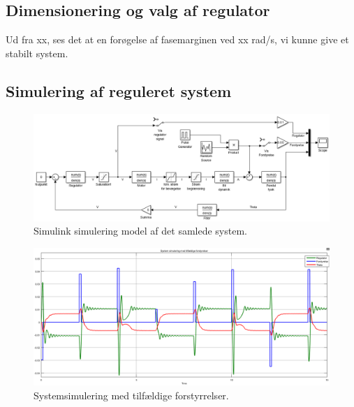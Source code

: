 \subsection{Dimensionering og valg af regulator}
Ud fra xx, ses det at en forøgelse af fasemarginen ved xx rad/s, vi kunne give et stabilt system.


\subsection{Simulering af reguleret system}
\begin{figure}[h!]
	\centering
	\includegraphics[width=1\textwidth]{billeder/transfunc_sim.png}
	\caption{Simulink simulering model af det samlede system.}
	\label{fig:transfunc_sim}
\end{figure}
\FloatBlock 


\begin{figure}[h!]
	\centering
	\includegraphics[width=1\textwidth]{billeder/system_sim_stimuli.png}
	\caption{Systemsimulering med tilfældige forstyrrelser.}
	\label{fig:system_sim_stimuli}
\end{figure}
\FloatBlock 


